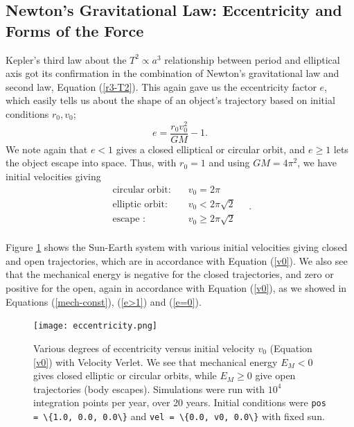 \documentclass[]{article}
\begin{document}
\subsection{Newton's Gravitational Law: Eccentricity and Forms of the Force}
Kepler's third law about the $T^2 \propto a^3$ relationship between period and elliptical axis got its confirmation in the combination of Newton's gravitational law and second law, Equation (\ref{r3-T2}). This again gave us the eccentricity factor $e$, which easily tells us about the shape of an object's trajectory based on initial conditions $r_0, v_0$;
\begin{equation}
	e = \frac{r_0 v_0^2}{GM} - 1.
\end{equation}
We note again that $e<1$ gives a closed elliptical or circular orbit, and $e \ge 1$ lets the object escape into space. Thus, with $r_0 = 1$ and using $GM = 4 \pi^2$, we have initial velocities giving
\begin{equation} \label{v0}
\begin{aligned}
	\text{circular orbit:}& \quad v_0 = 2 \pi \\
	\text{elliptic orbit:}& \quad v_0 < 2 \pi \sqrt{2} \\
	\text{escape :}& \quad v_0 \ge 2 \pi \sqrt{2} \\
\end{aligned} \quad.
\end{equation}

Figure \ref{fig:eccentricity} shows the Sun-Earth system with various initial velocities giving closed and open trajectories, which are in accordance with Equation (\ref{v0}). We also see that the mechanical energy is negative for the closed trajectories, and zero or positive for the open, again in accordance with Equation (\ref{v0}), as we showed in Equations (\ref{mech-const}), (\ref{e>1}) and (\ref{e=0}).

\begin{figure}[!htb]
	\centering
	\texttt{[image: eccentricity.png]}
	\caption{Various degrees of eccentricity versus initial velocity $v_0$ (Equation \ref{v0}) with Velocity Verlet. We see that mechanical energy $E_M < 0$ gives closed elliptic or circular orbits, while $E_M \ge 0$ give open trajectories (body escapes). Simulations were run with $10^4$ integration points per year, over 20 years. Initial conditions were \lstinline|pos = \{1.0, 0.0, 0.0\}| and \lstinline|vel = \{0.0, v0, 0.0\}| with fixed sun.}
	\label{fig:eccentricity}
\end{figure}
\end{document}
